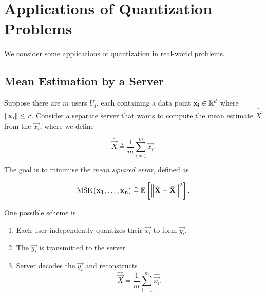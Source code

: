 \documentclass[twoside]{article}
\begin{document}



\section{Applications of Quantization Problems}

We consider some applications of quantization in real-world problems.

\subsection{Mean Estimation by a Server}

Suppose there are \(m\) users \(U_i\), each containing a data point \(\boldsymbol{\mathbf{x_i}} \in \mathbb R^d\) where \(\left\lVert\boldsymbol{\mathbf{x_i}}\right\rVert\le r\). Consider a separate server that wants to compute the mean estimate \(\bar{\vec{X}}\) from the \(\vec{x_i}\), where we define

\begin{equation}
    \bar{\vec{X}} \triangleq \frac{1}{m}\sum_{i=1}^m \vec{x_i}.
    \label{eq:Xbar-def}
\end{equation}

The goal is to minimise the \emph{mean squared error}, defined as

\begin{equation}
    \mathrm{MSE}\left(\boldsymbol{\mathbf{x_1}},\ldots,\boldsymbol{\mathbf{x_n}}\right) \triangleq \mathbb{E}\left[ \left\lVert\hat{\boldsymbol{\mathbf{X}}}-\bar{\boldsymbol{\mathbf{X}}}\right\rVert^2 \right].
    \label{eq:mse-def}
\end{equation}

One possible scheme is

\begin{enumerate}
    \item Each user independently quantizes their \(\vec{x_i}\) to form \(\vec{y_i}\).
    \item The \(\vec{y_i}\) is transmitted to the server.
    \item Server decodes the \(\vec{y_i}\) and reconstructs
        \begin{equation}
            \hat{\vec{X}} = \frac{1}{m}\sum_{i=1}^m \hat{\vec{x_i}}.
            \label{eq:srv-mean}
        \end{equation}
\end{enumerate}
\end{document}
